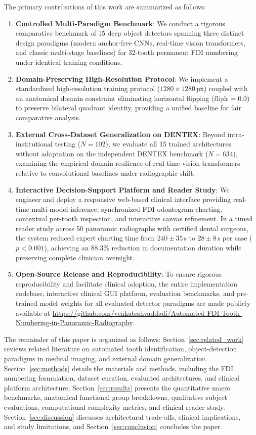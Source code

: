 \documentclass[10pt,journal,compsoc]{IEEEtran}
\begin{document}
The primary contributions of this work are summarized as follows:
\begin{enumerate}
    \item \textbf{Controlled Multi-Paradigm Benchmark}: We conduct a rigorous comparative benchmark of 15 deep object detectors spanning three distinct design paradigms (modern anchor-free CNNs, real-time vision transformers, and classic multi-stage baselines) for 32-tooth permanent FDI numbering under identical training conditions.
    \item \textbf{Domain-Preserving High-Resolution Protocol}: We implement a standardized high-resolution training protocol ($1280 \times 1280$\,px) coupled with an anatomical domain constraint eliminating horizontal flipping ($\text{fliplr} = 0.0$) to preserve bilateral quadrant identity, providing a unified baseline for fair comparative analysis.
    \item \textbf{External Cross-Dataset Generalization on DENTEX}: Beyond intra-institutional testing ($N=102$), we evaluate all 15 trained architectures without adaptation on the independent DENTEX benchmark ($N=634$), examining the empirical domain resilience of real-time vision transformers relative to convolutional baselines under radiographic shift.
    \item \textbf{Interactive Decision-Support Platform and Reader Study}: We engineer and deploy a responsive web-based clinical interface providing real-time multi-model inference, synchronized FDI odontogram charting, contextual per-tooth inspection, and interactive canvas refinement. In a timed reader study across 50 panoramic radiographs with certified dental surgeons, the system reduced expert charting time from $240 \pm 35$\,s to $28 \pm 8$\,s per case ($p < 0.001$), achieving an 88.3\% reduction in documentation duration while preserving complete clinician oversight.
    \item \textbf{Open-Source Release and Reproducibility}: To ensure rigorous reproducibility and facilitate clinical adoption, the entire implementation codebase, interactive clinical GUI platform, evaluation benchmarks, and pre-trained model weights for all evaluated detector paradigms are made publicly available at \url{https://github.com/venkateshvaddadi/Automated-FDI-Tooth-Numbering-in-Panoramic-Radiography}.
\end{enumerate}

The remainder of this paper is organized as follows: Section~\ref{sec:related_work} reviews related literature on automated tooth identification, object-detection paradigms in medical imaging, and external domain generalization. Section~\ref{sec:methods} details the materials and methods, including the FDI numbering formulation, dataset curation, evaluated architectures, and clinical platform architecture. Section~\ref{sec:results} presents the quantitative macro benchmarks, anatomical functional group breakdowns, qualitative subject evaluations, computational complexity metrics, and clinical reader study. Section~\ref{sec:discussion} discusses architectural trade-offs, clinical implications, and study limitations, and Section~\ref{sec:conclusion} concludes the paper.
\end{document}
